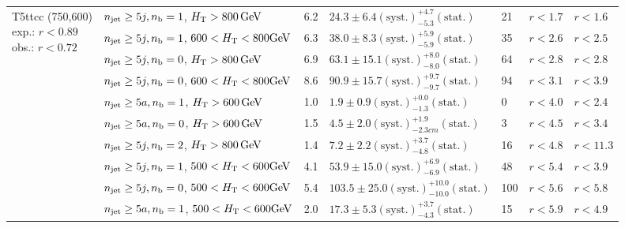 \begin{table}[h!]
\begin{tabular}{ lllllll }
\multirow{10}{*}{\parbox[t]{2.3cm}{T5ttcc (750,600)\\exp.: $r<0.89$\\obs.: $r<0.72$}}
 & $n_{\mathrm{jet}} \geq5j,n_{\text{b}} =1$, $\mbox{$H_\text{T}$} > 800 \, \mathrm{GeV}$ & 6.2 & $24.3 \pm 6.4 \mathrm{(syst.)} ^{+4.7}_{-5.3} \mathrm{(stat.)}$ & 21 & $r < 1.7$ & $r < 1.6$\\ 
 & $n_{\mathrm{jet}} \geq5j,n_{\text{b}} =1$, $600 < \mbox{$H_\text{T}$} < 800 \mathrm{GeV}$ & 6.3 & $38.0 \pm 8.3 \mathrm{(syst.)} ^{+5.9}_{-5.9} \mathrm{(stat.)}$ & 35 & $r < 2.6$ & $r < 2.5$\\ 
 & $n_{\mathrm{jet}} \geq5j,n_{\text{b}} =0$, $\mbox{$H_\text{T}$} > 800 \, \mathrm{GeV}$ & 6.9 & $63.1 \pm 15.1 \mathrm{(syst.)} ^{+8.0}_{-8.0} \mathrm{(stat.)}$ & 64 & $r < 2.8$ & $r < 2.8$\\ 
 & $n_{\mathrm{jet}} \geq5j,n_{\text{b}} =0$, $600 < \mbox{$H_\text{T}$} < 800 \mathrm{GeV}$ & 8.6 & $90.9 \pm 15.7 \mathrm{(syst.)} ^{+9.7}_{-9.7} \mathrm{(stat.)}$ & 94 & $r < 3.1$ & $r < 3.9$\\ 
 & $n_{\mathrm{jet}} \geq5a,n_{\text{b}} =1$, $\mbox{$H_\text{T}$} > 600 \, \mathrm{GeV}$ & 1.0 & $1.9 \pm 0.9 \mathrm{(syst.)} ^{+0.0}_{-1.3} \mathrm{(stat.)}$ & 0 & $r < 4.0$ & $r < 2.4$\\ 
 & $n_{\mathrm{jet}} \geq5a,n_{\text{b}} =0$, $\mbox{$H_\text{T}$} > 600 \, \mathrm{GeV}$ & 1.5 & $4.5 \pm 2.0 \mathrm{(syst.)} ^{+1.9}_{-2.3cm} \mathrm{(stat.)}$ & 3 & $r < 4.5$ & $r < 3.4$\\ 
 & $n_{\mathrm{jet}} \geq5j,n_{\text{b}} =2$, $\mbox{$H_\text{T}$} > 800 \, \mathrm{GeV}$ & 1.4 & $7.2 \pm 2.2 \mathrm{(syst.)} ^{+3.7}_{-4.8} \mathrm{(stat.)}$ & 16 & $r < 4.8$ & $r < 11.3$\\ 
 & $n_{\mathrm{jet}} \geq5j,n_{\text{b}} =1$, $500 < \mbox{$H_\text{T}$} < 600 \mathrm{GeV}$ & 4.1 & $53.9 \pm 15.0 \mathrm{(syst.)} ^{+6.9}_{-6.9} \mathrm{(stat.)}$ & 48 & $r < 5.4$ & $r < 3.9$\\ 
 & $n_{\mathrm{jet}} \geq5j,n_{\text{b}} =0$, $500 < \mbox{$H_\text{T}$} < 600 \mathrm{GeV}$ & 5.4 & $103.5 \pm 25.0 \mathrm{(syst.)} ^{+10.0}_{-10.0} \mathrm{(stat.)}$ & 100 & $r < 5.6$ & $r < 5.8$\\ 
 & $n_{\mathrm{jet}} \geq5a,n_{\text{b}} =1$, $500 < \mbox{$H_\text{T}$} < 600 \mathrm{GeV}$ & 2.0 & $17.3 \pm 5.3 \mathrm{(syst.)} ^{+3.7}_{-4.3} \mathrm{(stat.)}$ & 15 & $r < 5.9$ & $r < 4.9$\\ \hline
    \hline
  \end{tabular}
\end{table}

